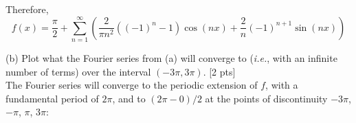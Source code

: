 \documentclass[11pt]{article}
\newcommand{\ie}{{\em i.e.}, }
\begin{document}
Therefore,
\begin{equation*}
f(x) = \frac{\pi}{2} + \sum_{n=1}^{\infty} \left( \frac{2}{\pi n^2} ((-1)^n - 1) \cos( nx) + \frac{2}{n} (-1)^{n+1} \sin( nx) \right)
\end{equation*}

(b) Plot what the Fourier series from (a) will converge to (\ie with an infinite number of terms) over the interval $(-3\pi, 3\pi)$. [2 pts] \\

The Fourier series will converge to the periodic extension of $f$, with a fundamental period of $2\pi$, and to $(2\pi - 0) / 2$ at the points of discontinuity $-3\pi$, $-\pi$, $\pi$, $3\pi$:

\iffalse
\begin{figure}[h]
\centering
\texttt{[image: plot]}
\label{fig:plot}
\end{figure}
\fi
\end{document}
